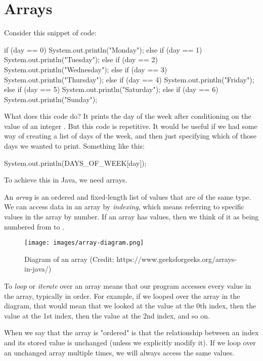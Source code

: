 \chapter{Arrays}
\label{ch:arrays}

Consider this snippet of code:

\begin{code}
if      (day ==  0) System.out.println("Monday");
else if (day ==  1) System.out.println("Tuesday");
else if (day ==  2) System.out.println("Wednesday");
else if (day ==  3) System.out.println("Thursday");
else if (day ==  4) System.out.println("Friday");
else if (day ==  5) System.out.println("Saturday");
else if (day ==  6) System.out.println("Sunday");
\end{code}

\noindent What does this code do? It prints the day of the week after conditioning on the value of an integer . But this code is repetitive. It would be useful if we had some way of creating a list of days of the week, and then just specifying which of those days we wanted to print. Something like this:

\begin{code}
System.out.println(DAYS\_OF\_WEEK[day]);
\end{code}

To achieve this in Java, we need arrays.

\begin{definition}
An \emph{array} is an ordered and fixed-length list of values that are of the same type. We can access data in an array by \emph{indexing}, which means referring to specific values in the array by number. If an array has  values, then we think of it as being numbered from  to .
\end{definition}

\begin{figure}
	\centering
	\texttt{[image: images/array-diagram.png]}
	\caption{Diagram of an array (Credit: https://www.geeksforgeeks.org/arrays-in-java/)}
\end{figure}

To \emph{loop} or \emph{iterate} over an array means that our program accesses every value in the array, typically in order. For example, if we looped over the array in the diagram, that would mean that we looked at the value at the 0th index, then the value at the 1st index, then the value at the 2nd index, and so on.

When we say that the array is "ordered" is that the relationship between an index and its stored value is unchanged (unless we explicitly modify it). If we loop over an unchanged array multiple times, we will always access the same values.

